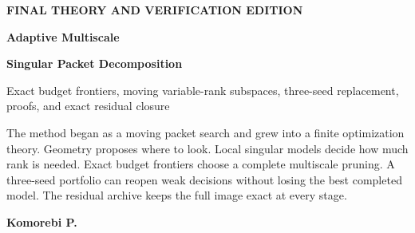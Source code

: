 \documentclass[11pt]{article}
\theoremstyle{definition}
\theoremstyle{remark}
\begin{document}
\hypersetup{pageanchor=false}

\begin{titlepage}
\thispagestyle{empty}
\vspace*{0.74in}
{\fontsize{13}{15}\selectfont\color{Blue}\bfseries FINAL THEORY AND VERIFICATION EDITION\par}
\vspace{0.20in}
{\fontsize{27}{31}\selectfont\bfseries Adaptive Multiscale\par}\vspace{0.05in}
{\fontsize{27}{31}\selectfont\bfseries Singular Packet Decomposition\par}
\vspace{0.18in}
{\fontsize{15}{19}\selectfont\color{Muted} Exact budget frontiers, moving variable-rank subspaces, three-seed replacement, proofs, and exact residual closure\par}
\vspace{0.45in}
\begin{minipage}{0.78\linewidth}
\large
The method began as a moving packet search and grew into a finite optimization theory. Geometry proposes where to look. Local singular models decide how much rank is needed. Exact budget frontiers choose a complete multiscale pruning. A three-seed portfolio can reopen weak decisions without losing the best completed model. The residual archive keeps the full image exact at every stage.
\end{minipage}
\vfill
{\fontsize{18}{21}\selectfont\bfseries Komorebi P.\par}
\vspace{0.3in}
\end{titlepage}
\hypersetup{pageanchor=true}
\end{document}
